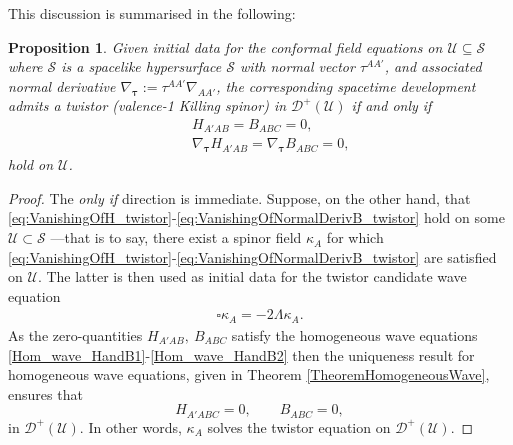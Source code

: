 \documentclass[10pt,a4paper]{article}
\theoremstyle{plain}
\newtheorem{proposition}{Proposition}
\begin{document}
This discussion is summarised in the following:
\begin{proposition}\label{Prop:Propagation_twistor}
  Given initial data for the conformal field equations on $\mathcal{U}\subseteq\mathcal{S}$
  where $\mathcal{S}$ is a spacelike
hypersurface $\mathcal{S}$ with normal vector $\tau^{AA'}$, and
associated normal derivative $\nabla_{\bm\tau} :=
\tau^{AA'}\nabla_{AA'}$, the corresponding spacetime development
admits a twistor (valence-1 Killing spinor) in $\mathcal{D}^{+}(\mathcal{U})$
if and only if
\begin{subequations}
\begin{eqnarray}
  && H_{A'AB}=B_{ABC}=0,\label{eq:VanishingOfH_twistor}\\ 
  &&\nabla_{\bm\tau}H_{A'AB}=\nabla_{\bm\tau}
  B_{ABC}=0, \label{eq:VanishingOfNormalDerivB_twistor}
\end{eqnarray}
\end{subequations}
 hold on $\mathcal{U}$.
\end{proposition}
\begin{proof}
The \emph{only if} direction is immediate. Suppose, on the other hand,
that
\eqref{eq:VanishingOfH_twistor}-\eqref{eq:VanishingOfNormalDerivB_twistor}
hold on some $\mathcal{U}\subset\mathcal{S}$ ---that is to say, there
exist a spinor field $\kappa_{A}$ for which
\eqref{eq:VanishingOfH_twistor}-\eqref{eq:VanishingOfNormalDerivB_twistor}
are satisfied on $\mathcal{U}$. The latter is then used as initial
data for the twistor candidate wave equation
\begin{align} \label{Wave_eq_twistor_candidate_prop}
\square \kappa _{A} = -2 \Lambda \kappa _{A}.
\end{align}
As the zero-quantities $H_{A'AB},~B_{ABC}$ satisfy the homogeneous
wave equations \eqref{Hom_wave_HandB1}-\eqref{Hom_wave_HandB2} then
the uniqueness result for homogeneous wave equations, given in
Theorem \ref{TheoremHomogeneousWave},
ensures that
\[ H_{A'ABC}=0,\qquad B_{ABC}=0,\]
in $\mathcal{D}^{+}(\mathcal{U})$. In other words,
$\kappa_{A}$ solves the twistor equation on $\mathcal{D}^{+}(\mathcal{U})$.
\end{proof}
\end{document}
